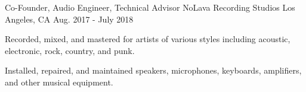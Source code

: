 \begin{cventries}
    \cventry
    {Co-Founder, Audio Engineer, Technical Advisor} %
    {NoLava Recording Studios} %
    {Los Angeles, CA} %
    {Aug. 2017 - July 2018} %
    {
      \begin{cvitems} %
        \item {Recorded, mixed, and mastered for artists of various styles including acoustic, electronic, rock, country, and punk.}
        \item {Installed, repaired, and maintained speakers, microphones, keyboards, amplifiers, and other musical equipment.}
      \end{cvitems}
    }

\end{cventries}
